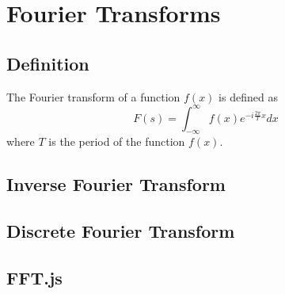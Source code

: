 \documentclass[
    fontsize=11pt, %
    parskip=half,   %
]{scrartcl} %
\begin{document}
\newpage

\section{Fourier Transforms}
\subsection{Definition}
The Fourier transform of a function \( f(x) \) is defined as
\begin{equation}
    F(s) = \int_{-\infty}^{\infty} f(x) e^{-i\frac{2\pi}{T}x} dx
\end{equation}
where \( T \) is the period of the function \( f(x) \).

\subsection{Inverse Fourier Transform}

\subsection{Discrete Fourier Transform}

\subsection{FFT.js}
\end{document}
